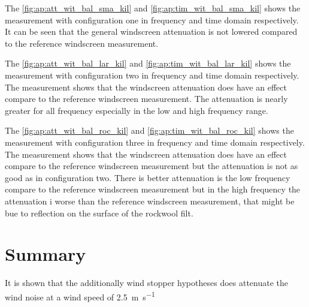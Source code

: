 The \autoref{fig:ap:att_wit_bal_sma_kil} and \autoref{fig:ap:tim_wit_bal_sma_kil} shows the measurement with configuration one in frequency and time domain respectively. It can be seen that the general windscreen attenuation is not lowered compared to the reference windscreen measurement.



The \autoref{fig:ap:att_wit_bal_lar_kil} and \autoref{fig:ap:tim_wit_bal_lar_kil} shows the measurement with configuration two in frequency and time domain respectively. The measurement shows that the windscreen attenuation does have an effect compare to the reference windscreen measurement. The attenuation is nearly greater for all frequency especially in the low and high frequency range.



The \autoref{fig:ap:att_wit_bal_roc_kil} and \autoref{fig:ap:tim_wit_bal_roc_kil} shows the measurement with configuration three in frequency and time domain respectively. The measurement shows that the windscreen attenuation does have an effect compare to the reference windscreen measurement but the attenuation is not as good as in configuration two. There is better attenuation is the low frequency compare to the reference windscreen measurement but in the high frequency the attenuation i worse than the reference windscreen measurement, that might be bue to reflection on the surface of the rockwool filt.


\section*{Summary}
It is shown that the additionally wind stopper hypotheses does attenuate the wind noise at a wind speed of \SI{2.5}{\meter\per\second}
